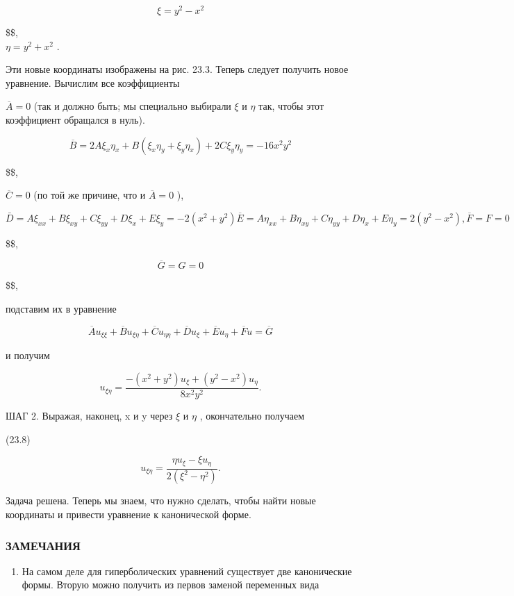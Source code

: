\documentclass[
  ukrainian,
]{article}
\providecommand{\tightlist}{%
  \setlength{\itemsep}{0pt}\setlength{\parskip}{0pt}}
\begin{document}
\[
\xi = y^2 - x^2
\]

\$\$,\\
\(\eta = y^2 + x^2\) .

Эти новые координаты изображены на рис. 23.3. Теперь следует получить
новое уравнение. Вычислим все коэффициенты

\(\overline{A} = 0\) (так и должно быть; мы специально выбирали \(\xi\)
и \(\eta\) так, чтобы этот коэффициент обращался в нуль).

\[
\overline{B} = 2A\xi_x\eta_x + B(\xi_x\eta_y + \xi_y\eta_x) + 2C\xi_y\eta_y = -16x^2y^2
\]

\$\$,

\(\overline{C} = 0\) (по той же причине, что и \(\overline{A} = 0\) ),

\[
\bar{D} = A\xi_{xx} + B\xi_{xy} + C\xi_{yy} + D\xi_x + E\xi_y = -2(x^2 + y^2)
\overline{E} = A\eta_{xx} + B\eta_{xy} + C\eta_{yy} + D\eta_x + E\eta_y = 2(y^2 - x^2),
\overline{F} = F = 0
\]

\$\$,

\[
\overline{G} = G = 0
\]

\$\$,

подставим их в уравнение

\[
\overline{A}u_{\xi\xi} + \overline{B}u_{\xi\eta} + \overline{C}u_{\eta\eta} + \overline{D}u_{\xi} + \overline{E}u_{\eta} + \overline{F}u = \overline{G}
\]

и получим

\[
u_{\xi\eta} = \frac{-(x^2 + y^2) u_{\xi} + (y^2 - x^2) u_{\eta}}{8x^2y^2}.
\]

ШАГ 2. Выражая, наконец, x и y через \(\xi\) и \(\eta\) , окончательно
получаем

(23.8)

\[
u_{\xi\eta} = \frac{\eta u_{\xi} - \xi u_{\eta}}{2(\xi^2 - \eta^2)}.
\]

Задача решена. Теперь мы знаем, что нужно сделать, чтобы найти новые
координаты и привести уравнение к канонической форме.

\subsubsection{ЗАМЕЧАНИЯ}\label{ux437ux430ux43cux435ux447ux430ux43dux438ux44f-4}

\begin{enumerate}
\def\labelenumi{\arabic{enumi}.}
\tightlist
\item
  На самом деле для гиперболических уравнений существует две
  канонические формы. Вторую можно получить из первов заменой переменных
  вида
\end{enumerate}
\end{document}
